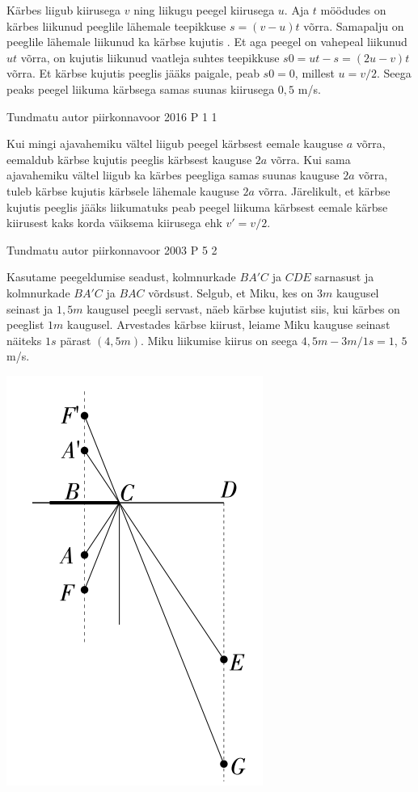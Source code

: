 \documentclass[11pt]{article}
\begin{document}
{{\ifSolution
Kärbes liigub kiirusega $v$ ning liikugu peegel kiirusega $u$. Aja $t$ möödudes on kärbes liikunud peeglile lähemale teepikkuse $s = (v -u)t$ võrra. Samapalju on peeglile lähemale liikunud ka kärbse kujutis . Et aga peegel on vahepeal liikunud $ut$ võrra, on kujutis liikunud vaatleja suhtes teepikkuse $s 0 = ut -s = (2u -v)t$ võrra. Et kärbse kujutis peeglis jääks paigale, peab $s 0 = 0$, millest $u = v/2$. Seega peaks peegel liikuma kärbsega samas suunas kiirusega $0,5$ m/s.
\fi
}

{Tundmatu autor} %
{piirkonnavoor} %
{2016} %
{P 1} %
{1} %
{

\ifSolution
Kui mingi ajavahemiku vältel liigub peegel kärbsest eemale kauguse $a$ võrra, eemaldub kärbse kujutis peeglis kärbsest kauguse $2a$ võrra. Kui sama ajavahemiku vältel liigub ka kärbes peegliga samas suunas kauguse $2a$ võrra, tuleb kärbse kujutis kärbsele lähemale kauguse $2a$ võrra. Järelikult, et kärbse kujutis peeglis jääks liikumatuks peab peegel liikuma kärbsest eemale kärbse kiirusest kaks korda väiksema kiirusega ehk $v'=v/2$.
\fi
}

{Tundmatu autor} %
{piirkonnavoor} %
{2003} %
{P 5} %
{2} %
{

\ifSolution
Kasutame peegeldumise seadust, kolmnurkade $BA'C$ ja $CDE$ sarnasust ja kolmnurkade $BA'C$ ja $BAC$ võrdsust. Selgub, et Miku, kes on $3 m$ kaugusel seinast ja $1,5 m$ kaugusel peegli servast, näeb kärbse kujutist siis, kui kärbes on peeglist $1 m$ kaugusel. Arvestades kärbse kiirust, leiame Miku kauguse seinast näiteks $1 s$ pärast $(4,5 m)$. Miku liikumise kiirus on seega $4,5 m - 3 m/1 s= 1$, $5$ m/s.
\begin{center}
	\includegraphics[width=0.5\linewidth]{2003-v2p-05-lah.PNG}
\end{center}
\fi
}
 


}
\end{document}
